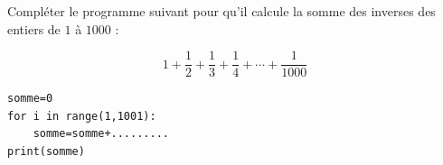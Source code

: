 \begin{exo}{}
	Compléter le programme suivant pour qu'il calcule la somme des inverses des entiers de $1$ à $1000$ :

	\[
		1 + \frac12 + \frac13 + \frac14 + \cdots + \frac1{1000}
	\]

	\begin{lstlisting}
somme=0
for i in range(1,1001):
    somme=somme+.........
print(somme)
\end{lstlisting}
\end{exo}
